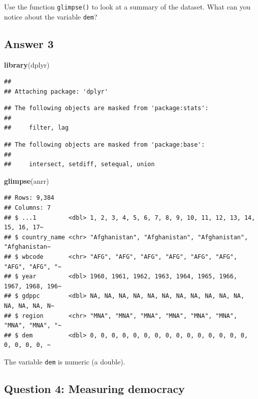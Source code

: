 \documentclass[
  11pt,
  letterpaper]{article}
\newenvironment{Shaded}{\begin{snugshade}}{\end{snugshade}}
\newcommand{\FunctionTok}[1]{\textcolor[rgb]{0.13,0.29,0.53}{\textbf{#1}}}
\newcommand{\NormalTok}[1]{#1}
\begin{document}
Use the function \texttt{glimpse()} to look at a summary of the dataset.
What can you notice about the variable \texttt{dem}?

\subsection{Answer 3}\label{answer-3}

\begin{Shaded}
\begin{Highlighting}[]
\FunctionTok{library}\NormalTok{(dplyr)}
\end{Highlighting}
\end{Shaded}

\begin{verbatim}
## 
## Attaching package: 'dplyr'
\end{verbatim}

\begin{verbatim}
## The following objects are masked from 'package:stats':
## 
##     filter, lag
\end{verbatim}

\begin{verbatim}
## The following objects are masked from 'package:base':
## 
##     intersect, setdiff, setequal, union
\end{verbatim}

\begin{Shaded}
\begin{Highlighting}[]
\FunctionTok{glimpse}\NormalTok{(anrr)}
\end{Highlighting}
\end{Shaded}

\begin{verbatim}
## Rows: 9,384
## Columns: 7
## $ ...1         <dbl> 1, 2, 3, 4, 5, 6, 7, 8, 9, 10, 11, 12, 13, 14, 15, 16, 17~
## $ country_name <chr> "Afghanistan", "Afghanistan", "Afghanistan", "Afghanistan~
## $ wbcode       <chr> "AFG", "AFG", "AFG", "AFG", "AFG", "AFG", "AFG", "AFG", "~
## $ year         <dbl> 1960, 1961, 1962, 1963, 1964, 1965, 1966, 1967, 1968, 196~
## $ gdppc        <dbl> NA, NA, NA, NA, NA, NA, NA, NA, NA, NA, NA, NA, NA, NA, N~
## $ region       <chr> "MNA", "MNA", "MNA", "MNA", "MNA", "MNA", "MNA", "MNA", "~
## $ dem          <dbl> 0, 0, 0, 0, 0, 0, 0, 0, 0, 0, 0, 0, 0, 0, 0, 0, 0, 0, 0, ~
\end{verbatim}

The variable \texttt{dem} is numeric (a double).

\subsection{Question 4: Measuring
democracy}\label{question-4-measuring-democracy}
\end{document}
